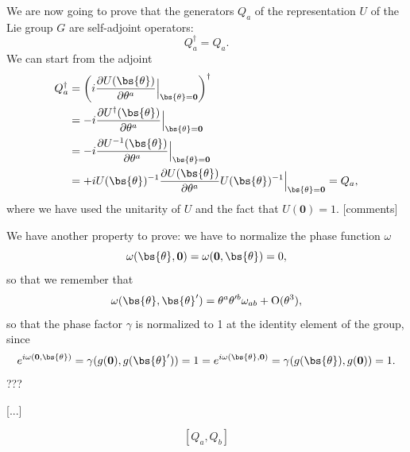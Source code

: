 We are now going to prove that the generators \(Q_a\) of the representation \(U\) of the Lie group \(G\) are self-adjoint operators:
\[
    Q_a^{\dagger} = Q_a.
\]
We can start from the adjoint
\[
    \begin{aligned}
        Q_a^{\dagger} & = \left(i \frac{\partial U(\bs{\theta})}{\partial \theta^a} \Big|_{\bs{\theta} = \mathbf{0}}\right)^{\dagger}                          \\
                      & = -i \frac{\partial U^{\dagger}(\bs{\theta})}{\partial \theta^a} \Big|_{\bs{\theta} = \mathbf{0}}                                      \\
                      & = -i \frac{\partial U^{-1}(\bs{\theta})}{\partial \theta^a} \Big|_{\bs{\theta} = \mathbf{0}}                                           \\
                      & = +i U(\bs{\theta})^{-1} \frac{\partial U(\bs{\theta})}{\partial \theta^a} U(\bs{\theta})^{-1} \Big|_{\bs{\theta} = \mathbf{0}} = Q_a,
    \end{aligned}
\]
where we have used the unitarity of \(U\) and the fact that \(U(\mathbf{0}) = 1\). [comments]

We have another property to prove: we have to normalize the phase function \(\omega\)
\[
    \omega(\bs{\theta}, \mathbf{0}) = \omega(\mathbf{0}, \bs{\theta}) = 0,
\]
so that we remember that
\[
    \omega(\bs{\theta}, \bs{\theta}') = \theta^a \theta'^b \omega_{ab} + \mathrm{O}(\theta^3),
\]
so that the phase factor \(\gamma\) is normalized to 1 at the identity element of the group, since
\[
    e^{i \omega(\mathbf{0}, \bs{\theta})} = \gamma(g(\mathbf{0}), g(\bs{\theta}')) = 1 = e^{i \omega(\bs{\theta}, \mathbf{0})} = \gamma(g(\bs{\theta}), g(\mathbf{0})) = 1.
\]
???

[...]

\[
    \left[ Q_a, Q_b \right]
\]

